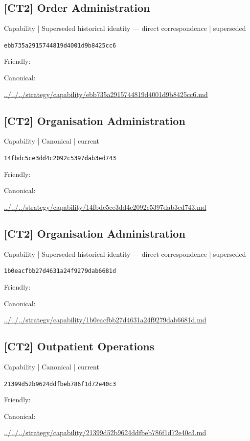 \documentclass[10pt,a4paper]{article}
\begin{document}
\subsection*{[CT2] Order Administration}
{\small Capability | Superseded historical identity — direct correspondence | superseded}\par
\texttt{ebb735a2915744819d4001d9b8425cc6}\par
Friendly: \par
Canonical: \par
{\footnotesize\url{../../../strategy/capability/ebb735a2915744819d4001d9b8425cc6.md}}\par
\subsection*{[CT2] Organisation Administration}
{\small Capability | Canonical | current}\par
\texttt{14fbdc5ce3dd4c2092c5397dab3ed743}\par
Friendly: \par
Canonical: \par
{\footnotesize\url{../../../strategy/capability/14fbdc5ce3dd4c2092c5397dab3ed743.md}}\par
\subsection*{[CT2] Organisation Administration}
{\small Capability | Superseded historical identity — direct correspondence | superseded}\par
\texttt{1b0eacfbb27d4631a24f9279dab6681d}\par
Friendly: \par
Canonical: \par
{\footnotesize\url{../../../strategy/capability/1b0eacfbb27d4631a24f9279dab6681d.md}}\par
\subsection*{[CT2] Outpatient Operations}
{\small Capability | Canonical | current}\par
\texttt{21399d52b9624ddfbeb786f1d72e40c3}\par
Friendly: \par
Canonical: \par
{\footnotesize\url{../../../strategy/capability/21399d52b9624ddfbeb786f1d72e40c3.md}}\par
\end{document}
